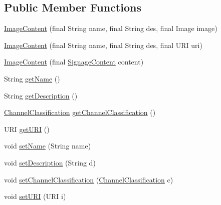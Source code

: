 \subsection*{Public Member Functions}
\begin{DoxyCompactItemize}
\item 
\hyperlink{classgov_1_1fnal_1_1ppd_1_1ZZattic_1_1ImageContent_a9a436aa035deaec846d206b80493413d}{Image\-Content} (final String name, final String des, final Image image)
\item 
\hyperlink{classgov_1_1fnal_1_1ppd_1_1ZZattic_1_1ImageContent_ae343dbd66e83d7363a3c8f33f100d08a}{Image\-Content} (final String name, final String des, final U\-R\-I uri)
\item 
\hyperlink{classgov_1_1fnal_1_1ppd_1_1ZZattic_1_1ImageContent_a319e3015659155ba208019d4e9f69b92}{Image\-Content} (final \hyperlink{interfacegov_1_1fnal_1_1ppd_1_1dd_1_1signage_1_1SignageContent}{Signage\-Content} content)
\item 
String \hyperlink{classgov_1_1fnal_1_1ppd_1_1ZZattic_1_1ImageContent_ae1ae95f243def8820b3f480f364256e0}{get\-Name} ()
\item 
String \hyperlink{classgov_1_1fnal_1_1ppd_1_1ZZattic_1_1ImageContent_a5772baf85233ba1e686e78d54cdb0924}{get\-Description} ()
\item 
\hyperlink{classgov_1_1fnal_1_1ppd_1_1dd_1_1changer_1_1ChannelClassification}{Channel\-Classification} \hyperlink{classgov_1_1fnal_1_1ppd_1_1ZZattic_1_1ImageContent_a216c416721cea3ee76cef1bcfb6ece33}{get\-Channel\-Classification} ()
\item 
U\-R\-I \hyperlink{classgov_1_1fnal_1_1ppd_1_1ZZattic_1_1ImageContent_addaeeee79f68396985167b16acde3ce5}{get\-U\-R\-I} ()
\item 
void \hyperlink{classgov_1_1fnal_1_1ppd_1_1ZZattic_1_1ImageContent_a1715fb4d37028675d5b53d87a4d5070e}{set\-Name} (String name)
\item 
void \hyperlink{classgov_1_1fnal_1_1ppd_1_1ZZattic_1_1ImageContent_ac50110d5fa4d1c6e3c486c8ebfc7001a}{set\-Description} (String d)
\item 
void \hyperlink{classgov_1_1fnal_1_1ppd_1_1ZZattic_1_1ImageContent_ab25a808ba87049d6712aeed798d4fa1d}{set\-Channel\-Classification} (\hyperlink{classgov_1_1fnal_1_1ppd_1_1dd_1_1changer_1_1ChannelClassification}{Channel\-Classification} c)
\item 
void \hyperlink{classgov_1_1fnal_1_1ppd_1_1ZZattic_1_1ImageContent_ab9f1a6ff63fca216fa45b3a952eb03b8}{set\-U\-R\-I} (U\-R\-I i)
\item 

\end{DoxyCompactItemize}
